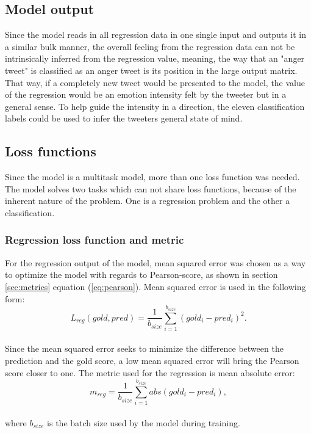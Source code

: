\subsection{Model output}
Since the model reads in all regression data in one single input and outputs it in a similar bulk manner, the overall feeling from the regression data can not be intrinsically inferred from the regression value, meaning, the way that an "anger tweet" is classified as an anger tweet is its position in the large output matrix. That way, if a completely new tweet would be presented to the model, the value of the regression would be an emotion intensity felt by the tweeter but in a general sense. To help guide the intensity in a direction, the eleven classification labels could be used to infer the tweeters general state of mind. 

\subsection{Loss functions}
Since the model is a multitask model, more than one loss function was needed. The model solves two tasks which can not share loss functions, because of the inherent nature of the problem. One is a regression problem and the other a classification.

\subsubsection{Regression loss function and metric}
For the regression output of the model, mean squared error was chosen as a way to optimize the model with regards to Pearson-score, as shown in section \ref{sec:metrics} equation (\ref{eq:pearson}). Mean squared error is used in the following form:\\
\begin{equation} \label{eq:lreg}
L_{reg}(gold, pred)=\dfrac{1}{b_{size}}\sum^{b_{size}}_{i=1}\left(gold_{i}-pred_{i}\right)^{2}.
\end{equation}\\
Since the mean squared error seeks to minimize the difference between the prediction and the gold score, a low mean squared error will bring the Pearson score closer to one. 
The metric used for the regression is mean absolute error:\\
\begin{equation} \label{eq:meanabs}
m_{reg}=\dfrac{1}{b_{size}}\sum^{b_{size}}_{i=1}abs\left(gold_{i}-pred_{i}\right),
\end{equation}\\
where $b_{size}$ is the batch size used by the model during training. 

